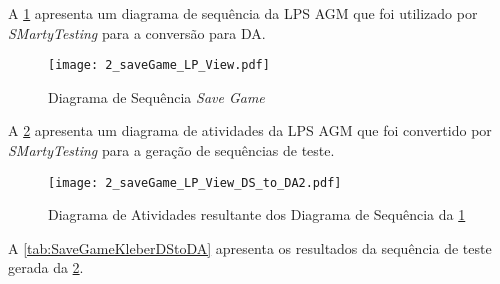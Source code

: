 A \ref{fig:SaveGameKleber} apresenta um diagrama de sequência da LPS AGM que foi utilizado por \textit{SMartyTesting} para a conversão para DA.

\begin{landscape}
	\begin{figure}[H]
		\centering
		\texttt{[image: 2\_saveGame\_LP\_View.pdf]}
		\caption{Diagrama de Sequência \textit{Save Game} \cite{marcolino2017variability}}
		\label{fig:SaveGameKleber}
	\end{figure}
\end{landscape}

A \ref{fig:SaveGameKleberDStoDA} apresenta um diagrama de atividades da LPS AGM que foi convertido por \textit{SMartyTesting} para a geração de sequências de teste.

	\begin{figure}[H]
		\centering
		\texttt{[image: 2\_saveGame\_LP\_View\_DS\_to\_DA2.pdf]}
		\caption{Diagrama de Atividades resultante dos Diagrama de Sequência da \ref{fig:SaveGameKleber}}
		\label{fig:SaveGameKleberDStoDA}
	\end{figure}

A \ref{tab:SaveGameKleberDStoDA} apresenta os resultados da sequência de teste gerada da \ref{fig:SaveGameKleberDStoDA}.

